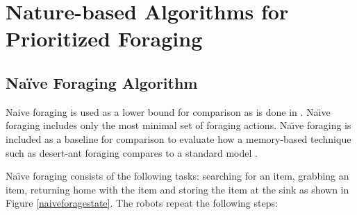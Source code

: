 
\chapter{Nature-based Algorithms for Prioritized Foraging}
\label{chap:third}




\section{Na\"ive Foraging Algorithm}


Naive foraging is used as a lower bound for comparison as is done in \cite{62} \cite{63}. Na\"\i ve foraging includes only the most minimal set of foraging actions. Na\"\i ve foraging is included as a baseline for comparison to evaluate how a memory-based technique such as desert-ant foraging compares to a standard model \cite{ostergaard2001emergent,hoff2010two}.

 Na\"\i ve foraging consists of the following tasks: searching for an item, grabbing an item, returning home with the item and storing the item at the sink as shown in Figure \ref{naiveforagestate}. The robots repeat the following steps: 

